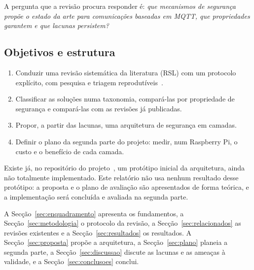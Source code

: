 A pergunta que a revisão procura responder é: \emph{que mecanismos de segurança
propõe o estado da arte para comunicações baseadas em MQTT, que propriedades
garantem e que lacunas persistem?}

\subsection{Objetivos e estrutura}

\begin{enumerate}[label=\textbf{O\arabic*.}, leftmargin=*]
  \item Conduzir uma revisão sistemática da literatura (RSL) com um protocolo explícito,
    com pesquisa e triagem reprodutíveis~\cite{kitchenham2007, page2021prisma}.
  \item Classificar as soluções numa taxonomia, compará-las por propriedade de
    segurança e compará-las com as revisões já publicadas.
  \item Propor, a partir das lacunas, uma arquitetura de segurança em camadas.
  \item Definir o plano da segunda parte do projeto: medir, num Raspberry Pi, o
    custo e o benefício de cada camada.
\end{enumerate}

Existe já, no repositório do projeto~\cite{mqttsecure2026repo}, um protótipo
inicial da arquitetura, ainda não totalmente implementado. Este relatório não usa
nenhum resultado desse protótipo: a proposta e o plano de avaliação são
apresentados de forma teórica, e a implementação será concluída e avaliada na
segunda parte.

A Secção~\ref{sec:enquadramento} apresenta os fundamentos, a
Secção~\ref{sec:metodologia} o protocolo da revisão, a
Secção~\ref{sec:relacionados} as revisões existentes e a
Secção~\ref{sec:resultados} os resultados. A Secção~\ref{sec:proposta} propõe a
arquitetura, a Secção~\ref{sec:plano} planeia a segunda parte, a
Secção~\ref{sec:discussao} discute as lacunas e as ameaças à validade, e a
Secção~\ref{sec:conclusoes} conclui.
